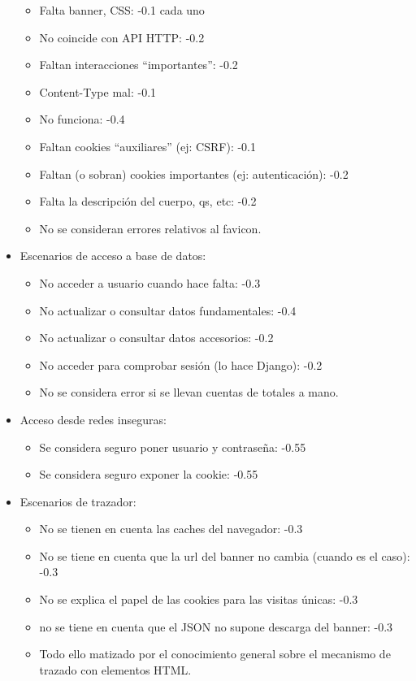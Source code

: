 \begin{itemize}
  \begin{itemize}
  \item Falta banner, CSS: -0.1 cada uno
  \item No coincide con API HTTP: -0.2
  \item Faltan interacciones ``importantes'': -0.2
  \item Content-Type mal: -0.1
  \item No funciona: -0.4
  \item Faltan cookies ``auxiliares'' (ej: CSRF): -0.1
  \item Faltan (o sobran) cookies importantes (ej: autenticación): -0.2
  \item Falta la descripción del cuerpo, qs, etc: -0.2
  \item No se consideran errores relativos al favicon.
  \end{itemize}
\item Escenarios de acceso a base de datos:
  \begin{itemize}
  \item No acceder a usuario cuando hace falta: -0.3
  \item No actualizar o consultar datos fundamentales: -0.4
  \item No actualizar o consultar datos accesorios: -0.2
  \item No acceder para comprobar sesión (lo hace Django): -0.2
  \item No se considera error si se llevan cuentas de totales a mano.
  \end{itemize}
\item Acceso desde redes inseguras:
  \begin{itemize}
  \item Se considera seguro poner usuario y contraseña: -0.55
  \item Se considera seguro exponer la cookie: -0.55
  \end{itemize}
\item Escenarios de trazador:
  \begin{itemize}
  \item No se tienen en cuenta las caches del navegador: -0.3
  \item No se tiene en cuenta que la url del banner no cambia (cuando es el caso): -0.3
  \item No se explica el papel de las cookies para las visitas únicas: -0.3
  \item no se tiene en cuenta que el JSON no supone descarga del banner: -0.3
  \item Todo ello matizado por el conocimiento general sobre el mecanismo de trazado con elementos HTML.
  \end{itemize}
\end{itemize}

